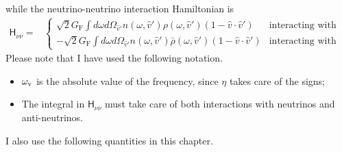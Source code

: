 while the neutrino-neutrino interaction Hamiltonian is
\begin{align*}
   \mathsf H_{\nu\nu} =& \begin{cases}
   \sqrt{2}G_{\mathrm F} \int d\omega d\Omega_{\hat v'} n(\omega,\hat v')\rho(\omega,\hat v') (1-\hat v \cdot \hat v') & \text{interacting with neutrinos} \\
   - \sqrt{2}G_{\mathrm F} \int d\omega d\Omega_{\hat v'} n(\omega,\hat v')\bar\rho(\omega,\hat v') (1-\hat v \cdot \hat v') &  \text{interacting with antineutrinos}
   \end{cases}
\end{align*}
Please note that I have used the following notation.
\begin{itemize}
    \item $\omega_\mathrm v$ is the absolute value of the frequency, since $\eta$ takes care of the signs;
    \item The integral in $\mathsf H_{\nu\nu}$ must take care of both interactions with neutrinos and anti-neutrinos.
\end{itemize}
I also use the following quantities in this chapter.

